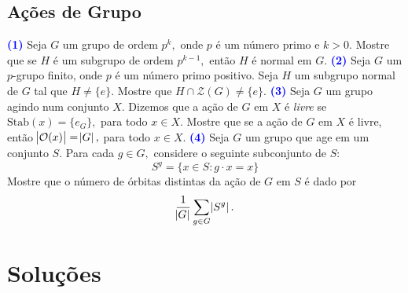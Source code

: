 \documentclass[12pt, a4paper]{article}
\begin{document}
 \subsection{\textcolor{Floresta}{Ações de Grupo}}
 \textcolor{blue}{\bf(1)}\label{100} Seja $G$ um grupo de ordem $p^k,$ onde $p$ é um número primo e $k > 0.$ Mostre que se $H$ é um subgrupo de ordem $p^{k-1},$ então $H$ é normal em $G.$
 \newline\newline
\textcolor{blue}{\bf(2)}\label{101} Seja $G$ um $p$-grupo finito, onde $p$ é um número primo positivo. Seja $H$ um subgrupo normal de $G$ tal que $H \neq \{ e \}.$ Mostre que $H \cap \mathcal{Z}(G) \neq \{ e \}.$
 \newline\newline
\textcolor{blue}{\bf(3)}\label{102} Seja $G$ um grupo agindo num conjunto $X.$ Dizemos que a ação de $G$ em $X$ é \emph{livre} se $\mbox{Stab}(x) = \{ e_G \},$ para todo $x \in X.$ Mostre que se a ação de $G$ em $X$ é livre, então $\abs{\mathcal{O}(x)} = \abs{G},$ para todo $x \in X.$
 \newline\newline
\textcolor{blue}{\bf(4)}\label{103} Seja $G$ um grupo que age em um conjunto $S.$ Para cada $g \in G,$ considere o seguinte subconjunto de $S:$
\[
S^g = \{ x \in S \colon g \cdot x = x \}
\]
Mostre que o número de órbitas distintas da ação de $G$ em $S$ é dado por
\[
\frac{1}{\abs{G}} \sum\limits_{g \in G} \abs{S^g}.
\]

\newpage

\section{Soluções}
\end{document}

